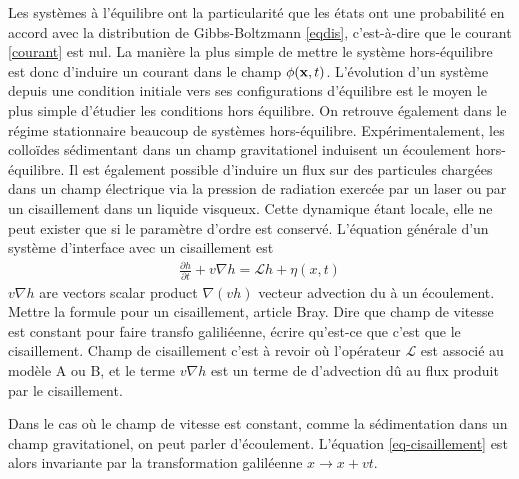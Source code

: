 Les systèmes à l'équilibre ont la particularité que les états ont une probabilité en accord avec la distribution de Gibbs-Boltzmann \ref{eqdis}, c'est-à-dire que le courant \ref{courant} est nul. La manière la plus simple de mettre le système hors-équilibre est donc d'induire un courant dans le champ $\phi({\bf x},t)$. L'évolution d'un système depuis une condition initiale vers ses configurations d'équilibre est le moyen le plus simple d'étudier les conditions hors équilibre. On retrouve également dans le régime stationnaire beaucoup de systèmes hors-équilibre. Expérimentalement, les colloïdes sédimentant dans un champ gravitationel induisent un écoulement hors-équilibre. Il est également possible d'induire un flux sur des particules chargées dans un champ électrique via la pression de radiation exercée par un laser ou par un cisaillement dans un liquide visqueux\cite{girot_conical_2019}. Cette dynamique étant locale, elle ne peut exister que si le paramètre d'ordre est conservé. L'équation générale d'un système d'interface avec un cisaillement est\cite{bray_interface_2001-1,bray_interface_2001}
\begin{align}
     \frac{\partial h}{\partial t} + v \nabla h =  \mathcal{L} h +  \eta(x,t)
     \label{eq-cisaillement}
\end{align}
{\color{red} $v \nabla h$ are vectors scalar product $\nabla (vh)$ vecteur advection du à un écoulement. Mettre la formule pour un cisaillement, article Bray. Dire que champ de vitesse est constant pour faire transfo galiliéenne, écrire qu'est-ce que c'est que le cisaillement. 
Champ de cisaillement c'est à revoir}
où l'opérateur $\mathcal{L}$ est associé au modèle A ou B, et le terme $v \nabla h$ est un terme de d'advection dû au flux produit par le cisaillement. 

Dans le cas où le champ de vitesse est constant, comme la sédimentation dans un champ gravitationel, on peut parler d'écoulement. L'équation \ref{eq-cisaillement} est alors invariante par la transformation galiléenne $x \rightarrow x+vt$. 

